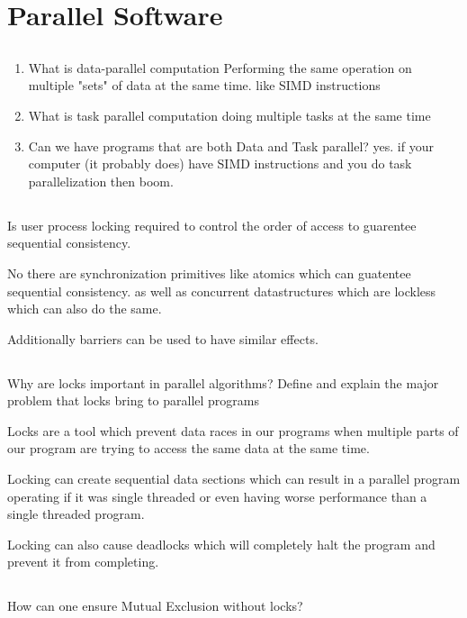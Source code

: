 \documentclass[12pt]{article}
\begin{document}
\section{Parallel Software}
\subsection{}
\begin{enumerate}
	\item What is data-parallel computation
	\subitem Performing the same operation on multiple "sets" of data at the same time. like SIMD instructions
	\item What is task parallel computation
	\subitem doing multiple tasks at the same time 
	\item Can we have programs that are both Data and Task parallel?
	\subitem yes. if your computer (it probably does) have SIMD instructions and you do task parallelization then boom.
\end{enumerate}

\subsection{}
Is user process locking required to control the order of access to guarentee sequential consistency.

No there are synchronization primitives like atomics which can guatentee sequential consistency. as well as concurrent datastructures which are lockless which can also do the same.

Additionally barriers can be used to have similar effects.
\subsection{}
Why are locks important in parallel algorithms? Define and explain the major problem that locks bring to parallel programs

Locks are a tool which prevent data races in our programs when multiple parts of our program are trying to access the same data at the same time. 

Locking can create sequential data sections which can result in a parallel program operating if it was single threaded or even having worse performance than a single threaded program.

Locking can also cause deadlocks which will completely halt the program and prevent it from completing.
\subsection{}
How can one ensure Mutual Exclusion without locks?
\end{document}
